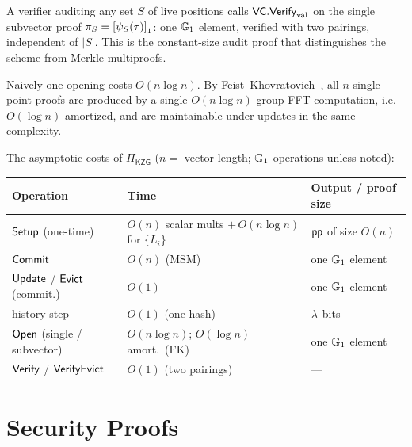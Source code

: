 \begin{remark}\label{rem:agg}
A verifier auditing any set $S$ of live positions calls $\mathsf{VC}.\mathsf{Verify}_{\mathrm{val}}$ on the
single subvector proof $\pi_S=\left[\psi_S(\tau)\right]_{1}$: one $\mathbb{G}_1$ element, verified
with two pairings, independent of $|S|$. This is the constant-size audit proof
that distinguishes the scheme from Merkle multiproofs.
\end{remark}

\begin{remark}\label{rem:fk}
Naively one opening costs $O(n\log n)$. By Feist--Khovratovich~\cite{fk}, all $n$
single-point proofs are produced by a single $O(n\log n)$ group-FFT computation,
i.e.\ $O(\log n)$ amortized, and are maintainable under updates in the same
complexity.
\end{remark}

\noindent The asymptotic costs of $\Pi_{\mathsf{KZG}}$ ($n=$ vector length;
$\mathbb{G}_1$ operations unless noted):

\begin{center}
\renewcommand{\arraystretch}{1.15}
\begin{tabular}{@{}lll@{}}
\toprule
Operation & Time & Output / proof size \\
\midrule
$\mathsf{Setup}$ (one-time)            & $O(n)$ scalar mults $+\,O(n\log n)$ for $\{L_i\}$ & $\mathsf{pp}$ of size $O(n)$ \\
$\mathsf{Commit}$                      & $O(n)$ (MSM)                       & one $\mathbb{G}_1$ element \\
$\mathsf{Update}$ / $\mathsf{Evict}$ (commit.) & $O(1)$                             & one $\mathbb{G}_1$ element \\
history step                   & $O(1)$ (one hash)                 & $\lambda$ bits \\
$\mathsf{Open}$ (single / subvector)   & $O(n\log n)$; $O(\log n)$ amort.\ (FK) & one $\mathbb{G}_1$ element \\
$\mathsf{Verify}$ / $\mathsf{VerifyEvict}$           & $O(1)$ (two pairings)             & --- \\
\bottomrule
\end{tabular}
\end{center}

\section{Security Proofs}\label{sec:proofs}

